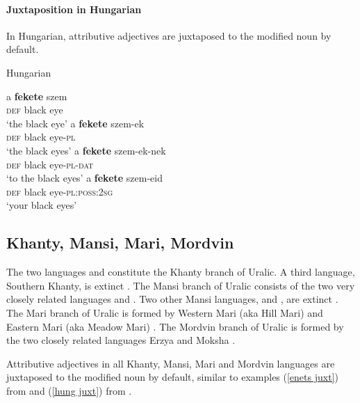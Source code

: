 \paragraph*{Juxtaposition in Hungarian}
In Hungarian, attributive adjectives are juxtaposed to the modified noun by default.
\begin{exe}
\ex \rm{Hungarian \citep[41]{hall1938}}
\label{hung juxt}
\begin{xlist}
\ex 
\gll	a \textbf{fekete} szem\\
	\textsc{def} black eye\\
\glt	‘the black eye’
\ex	
\gll	a \textbf{fekete} szem-ek\\
	\textsc{def} black eye-\textsc{pl}\\
\glt	‘the black eyes’
\ex
\gll	a \textbf{fekete} szem-ek-nek\\
	\textsc{def} black eye-\textsc{pl}-\textsc{dat}\\
\glt	‘to the black eyes’
\ex
\gll	a \textbf{fekete} szem-eid\\
	\textsc{def} black eye-\textsc{pl:poss:2sg}\\
\glt	‘your black eyes’
\end{xlist}
\end{exe}

\subsection{Khanty, Mansi, Mari, Mordvin}
The two languages  and  constitute the Khanty branch of Uralic. A third language, Southern Khanty, is extinct \citep[231]{salminen2007}. The Mansi branch of Uralic consists of the two very closely related languages  and . Two other Mansi languages,  and , are extinct \citep[231]{salminen2007}. The Mari branch of Uralic is formed by Western Mari (aka Hill Mari) and Eastern Mari (aka Meadow Mari) \citep[231]{salminen2007}. The Mordvin branch of Uralic is formed by the two closely related languages Erzya and Moksha  \citep[231]{salminen2007}.

Attributive adjectives in all Khanty, Mansi, Mari and Mordvin languages are juxtaposed to the modified noun by default, similar to examples (\ref{enets juxt}) from  and (\ref{hung juxt}) from .

